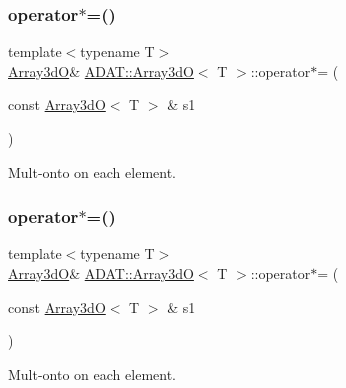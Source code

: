 \subsubsection{\texorpdfstring{operator$\ast$=()}{operator*=()}\hspace{0.1cm}{\footnotesize\ttfamily [2/6]}}
{\footnotesize\ttfamily template$<$typename T$>$ \\
\mbox{\hyperlink{classADAT_1_1Array3dO}{Array3dO}}\& \mbox{\hyperlink{classADAT_1_1Array3dO}{A\+D\+A\+T\+::\+Array3dO}}$<$ T $>$\+::operator$\ast$= (\begin{DoxyParamCaption}\item[{const \mbox{\hyperlink{classADAT_1_1Array3dO}{Array3dO}}$<$ T $>$ \&}]{s1 }\end{DoxyParamCaption})\hspace{0.3cm}{\ttfamily [inline]}}



Mult-\/onto on each element. 

\mbox{\label{classADAT_1_1Array3dO_a739c7272b271536ac15a00b5da43b6d6}} 
\subsubsection{\texorpdfstring{operator$\ast$=()}{operator*=()}\hspace{0.1cm}{\footnotesize\ttfamily [3/6]}}
{\footnotesize\ttfamily template$<$typename T$>$ \\
\mbox{\hyperlink{classADAT_1_1Array3dO}{Array3dO}}\& \mbox{\hyperlink{classADAT_1_1Array3dO}{A\+D\+A\+T\+::\+Array3dO}}$<$ T $>$\+::operator$\ast$= (\begin{DoxyParamCaption}\item[{const \mbox{\hyperlink{classADAT_1_1Array3dO}{Array3dO}}$<$ T $>$ \&}]{s1 }\end{DoxyParamCaption})\hspace{0.3cm}{\ttfamily [inline]}}



Mult-\/onto on each element. 

\mbox{\label{classADAT_1_1Array3dO_acec17a674874030d454e516aad24f8a8}} 
